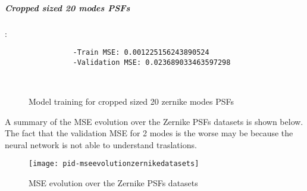		\subparagraph{Cropped sized 20 modes PSFs}:\\
		\begin{lstlisting}	
        		-Train MSE: 0.001225156243890524
        		-Validation MSE: 0.023689033463597298
		\end{lstlisting}
		
		\begin{figure*}[ht!]
			\hspace{\fill}
			\hspace{\fill}
			\\
			\caption{Model training for cropped sized 20 zernike modes PSFs}
		\end{figure*}
		\FloatBarrier
		
		A summary of the MSE evolution over the Zernike PSFs datasets is shown below. The fact that the validation MSE for 2 modes is the worse may be because the neural network is not able to understand traslations.
		\begin{figure*}[ht!]
			\centering
			\texttt{[image: pid-mseevolutionzernikedatasets]}
			\caption{MSE evolution over the Zernike PSFs datasets}
		\end{figure*}
		
		\FloatBarrier